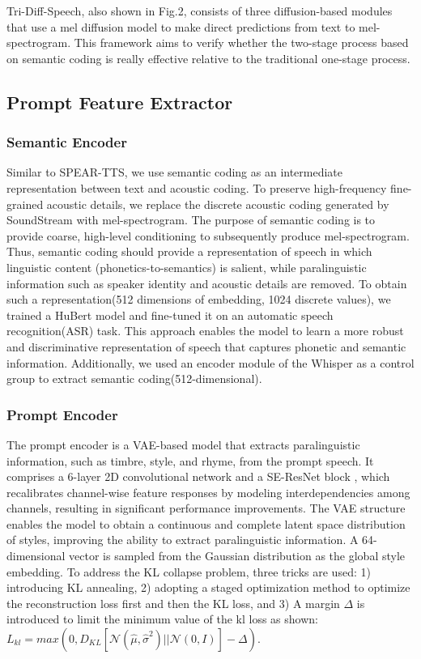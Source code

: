 \documentclass{article}
\begin{document}
Tri-Diff-Speech, also shown in Fig.2, consists of three diffusion-based modules that use a mel diffusion model to make direct predictions from text to mel-spectrogram. This framework aims to verify whether the two-stage process based on semantic coding is really effective relative to the traditional one-stage process. 

\subsection{Prompt Feature Extractor}
\subsubsection{Semantic Encoder}

Similar to SPEAR-TTS\cite{zhang2023speak}, we use semantic coding as an intermediate representation between text and acoustic coding. To preserve high-frequency fine-grained acoustic details, we replace the discrete acoustic coding generated by SoundStream\cite{zeghidour2021soundstream} with mel-spectrogram. The purpose of semantic coding is to provide coarse, high-level conditioning to subsequently produce mel-spectrogram.  Thus, semantic coding should provide a representation of speech in which linguistic content (phonetics-to-semantics) is salient, while paralinguistic information such as speaker identity and acoustic details are removed. To obtain such a representation(512 dimensions of embedding, 1024 discrete values), we trained a HuBert\cite{hsu2021hubert} model and fine-tuned it on an automatic speech recognition(ASR) task. This approach enables the model to learn a more robust and discriminative representation of speech that captures phonetic and semantic information. Additionally, we used an encoder module of the Whisper\cite{radford2023robust} as a control group to extract semantic coding(512-dimensional).

\subsubsection{Prompt Encoder}

The prompt encoder is a VAE-based model \cite{qiang2023improving} that extracts paralinguistic information, such as timbre, style, and rhyme, from the prompt speech. It comprises a 6-layer 2D convolutional network and a SE-ResNet block \cite{hu2018squeeze}, which recalibrates channel-wise feature responses by modeling interdependencies among channels, resulting in significant performance improvements. The VAE structure enables the model to obtain a continuous and complete latent space distribution of styles, improving the ability to extract paralinguistic information. A 64-dimensional vector is sampled from the Gaussian distribution as the global style embedding. To address the KL collapse problem, three tricks are used: 1) introducing KL annealing, 2) adopting a staged optimization method to optimize the reconstruction loss first and then the KL loss, and 3) A margin $\Delta$ is introduced to limit the minimum value of the kl loss as shown:${L}_{kl} = max(0, D_{KL}[\mathcal{N}({\hat{\mu}},{\hat{\sigma}}^2)||\mathcal{N}(0, I)]-\Delta)$. 
\end{document}
